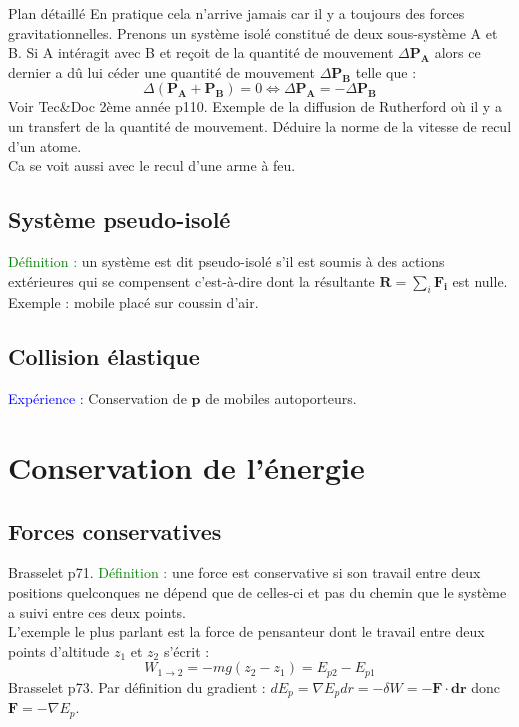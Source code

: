 \begin{reportBlock}{Plan détaillé}
En pratique cela n'arrive jamais car il y a toujours des forces gravitationnelles. Prenons un système isolé constitué de deux sous-système A et B. Si A intéragit avec B et reçoit de la quantité de mouvement $\Delta \mathbf{P_A}$ alors ce dernier a dû lui céder une quantité de mouvement $\Delta \mathbf{P_B}$ telle que :
\begin{equation}
    \Delta(\mathbf{P_A}+\mathbf{P_B})= 0 \Leftrightarrow \Delta\mathbf{P_A} = -\Delta\mathbf{P_B}
\end{equation}
Voir Tec\&Doc 2ème année p110. Exemple de la diffusion de Rutherford où il y a un transfert de la quantité de mouvement. Déduire la norme de la vitesse de recul d'un atome.\\
Ca se voit aussi avec le recul d'une arme à feu.
\subsection{Système pseudo-isolé}
\textcolor{green}{Définition :} un système est dit pseudo-isolé s'il est soumis à des actions extérieures qui se compensent c'est-à-dire dont la résultante $\mathbf{R}=\sum_i\mathbf{F_i}$ est nulle.\\

Exemple : mobile placé sur coussin d'air.
\subsection{Collision élastique}
\textcolor{blue}{Expérience : }Conservation de $\mathbf{p}$ de mobiles autoporteurs.

\section{Conservation de l'énergie}

\subsection{Forces conservatives}
Brasselet p71. \textcolor{green}{Définition :} une force est conservative si son travail entre deux positions quelconques ne dépend que de celles-ci et pas du chemin que le système a suivi entre ces deux points.\\
L'exemple le plus parlant est la force de pensanteur dont le travail entre deux points d'altitude $z_1$ et $z_2$ s'écrit :
\begin{equation}
    W_{1\rightarrow2}=-mg(z_2-z_1) = E_{p2}-E_{p1}
\end{equation}
Brasselet p73. Par définition du gradient : $dE_p=\nabla E_p dr = -\delta W = -\mathbf{F}\cdot\mathbf{dr}$ donc $\mathbf{F}=-\nabla E_p$.

\end{reportBlock}

